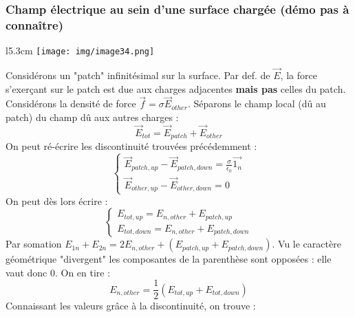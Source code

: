 \documentclass[11pt, a4paper, openany]{book}
\begin{document}
		\subsubsection{Champ électrique au sein d'une surface chargée (démo pas à connaître)}
		\begin{wrapfigure}[12]{l}{5.3cm}
			\texttt{[image: img/image34.png]}
		\end{wrapfigure}
		Considérons un "patch" infinitésimal sur la surface. Par def. de $\vec E$, la force s'exerçant sur le patch est due aux charges adjacentes \textbf{mais pas} celles du patch. Considérons la densité de force $\vec{f} = \sigma\vec{E}_{other}$. Séparons le champ local (dû au patch) du champ dû aux autres charges :
		\begin{equation}
		\vec{E}_{tot} = \vec{E}_{patch} + \vec{E}_{other}
		\end{equation}
		On peut ré-écrire les discontinuité trouvées précédemment :
		\begin{equation}
		\left\{\begin{array}{l}
		\vec{E}_{patch,up} - \vec{E}_{patch,down} = \frac{\sigma}{\epsilon_0}\vec{1_n}\\
		\vec{E}_{other, up} - \vec{E}_{other,down} = 0
		\end{array}\right.
		\end{equation}
		On peut dès lors écrire :
		\begin{equation}
		\left\{\begin{array}{l}
		E_{tot, up} = E_{n,other} + E_{patch, up}\\
		E_{tot,down} = E_{n,other} + E_{patch, down}
		\end{array}\right.
		\end{equation}
		Par somation $E_{1n} + E_{2n} = 2E_{n,other} + (E_{patch,up} + E_{patch, down})$. Vu le caractère géométrique "divergent" les composantes de la parenthèse sont opposées : elle vaut donc 0. On en tire :
		\begin{equation}
		E_{n,other} = \frac{1}{2}(E_{tot,up} + E_{tot,down})
		\end{equation}
		Connaissant les valeurs grâce à la discontinuité, on trouve :\\
		
		
\end{document}
